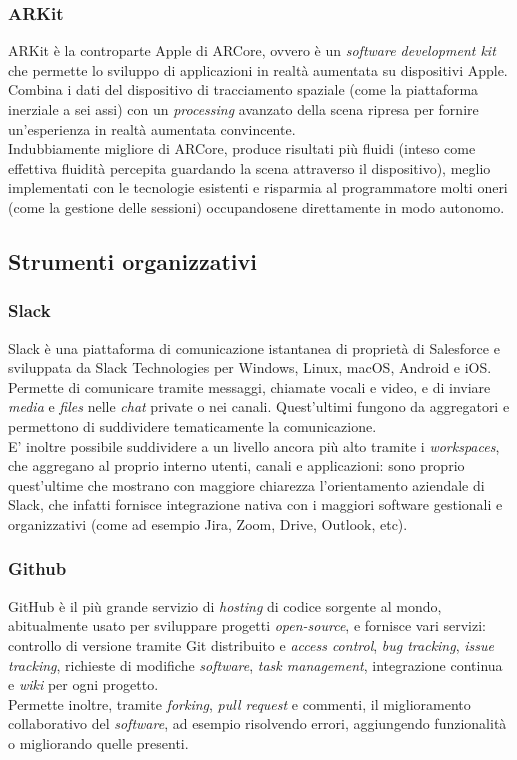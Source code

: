 \subsubsection{ARKit}
ARKit è la controparte Apple di ARCore, ovvero è un \textit{software development kit} che permette lo sviluppo di applicazioni in realtà aumentata su dispositivi Apple.\\
Combina i dati del dispositivo di tracciamento spaziale (come la piattaforma inerziale a sei assi) con un \textit{processing} avanzato della scena ripresa per fornire un'esperienza in realtà aumentata convincente.\\
Indubbiamente migliore di ARCore, produce risultati più fluidi (inteso come effettiva fluidità percepita guardando la scena attraverso il dispositivo), meglio implementati con le tecnologie esistenti e risparmia al programmatore molti oneri (come la gestione delle sessioni) occupandosene direttamente in modo autonomo.
\subsection{Strumenti organizzativi}

\subsubsection{Slack}
Slack è una piattaforma di comunicazione istantanea di proprietà di Salesforce e sviluppata da Slack Technologies per Windows, Linux, macOS, Android e iOS.\\
Permette di comunicare tramite messaggi, chiamate vocali e video, e di inviare \textit{media} e \textit{files} nelle \textit{chat} private o nei canali. Quest'ultimi fungono da aggregatori e permettono di suddividere tematicamente la comunicazione.\\
E' inoltre possibile suddividere a un livello ancora più alto tramite i \textit{workspaces}, che aggregano al proprio interno utenti, canali e applicazioni: sono proprio quest'ultime che mostrano con maggiore chiarezza l'orientamento aziendale di Slack, che infatti fornisce integrazione nativa con i maggiori software gestionali e organizzativi (come ad esempio Jira, Zoom, Drive, Outlook, etc).

\subsubsection{Github}
GitHub è il più grande servizio di \textit{hosting} di codice sorgente al mondo, abitualmente usato per sviluppare progetti \textit{open-source}, e fornisce vari servizi: controllo di versione tramite Git distribuito e \textit{access control}, \textit{bug tracking}, \textit{issue tracking}, richieste di modifiche \textit{software}, \textit{task management}, integrazione continua e \textit{wiki} per ogni progetto.\\ 
Permette inoltre, tramite \textit{forking}, \textit{pull request} e commenti, il miglioramento collaborativo del \textit{software}, ad esempio risolvendo errori, aggiungendo funzionalità o migliorando quelle presenti.

